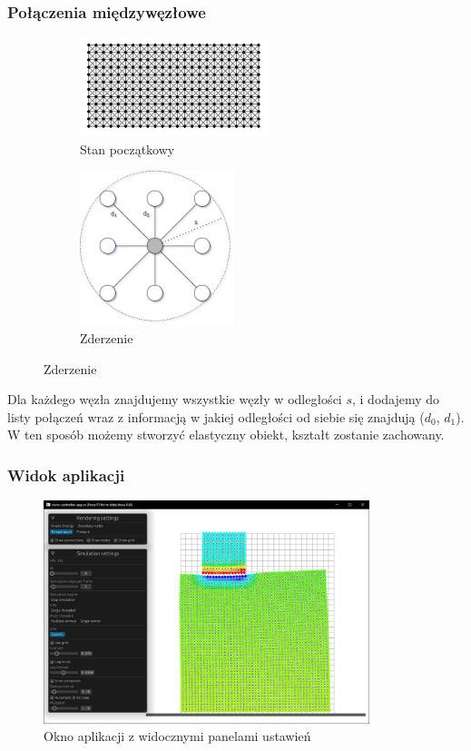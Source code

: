 \documentclass{beamer}
\begin{document}
\begin{frame}
    \frametitle{Połączenia międzywęzłowe}

    \begin{figure}[h]
        \begin{subfigure}{0.45\textwidth}
            \centering
            \includegraphics[width=5.5cm]{12x24}
            \caption{Stan początkowy}
        \end{subfigure}
        \begin{subfigure}{0.45\textwidth}
            \centering
            \includegraphics[width=4.5cm]{connections.drawio}
            \caption{Zderzenie}
        \end{subfigure}
    \end{figure}

    Dla każdego węzła znajdujemy wszystkie węzły w odległości $s$, i dodajemy do listy połączeń wraz z informacją
    w jakiej odległości od siebie się znajdują ($d_0$, $d_1$). W ten sposób możemy stworzyć elastyczny obiekt, kształt
    zostanie zachowany.
\end{frame}

\begin{frame}
    \frametitle{Widok aplikacji}
    \begin{figure}[H]
        \centering
        \includegraphics[width=9.5cm]{app_view_full.png}
        \caption{Okno aplikacji z widocznymi panelami ustawień}
    \end{figure}
\end{frame}
\end{document}
